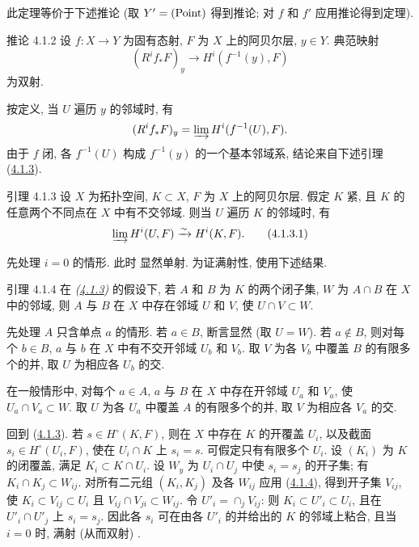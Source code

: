 此定理等价于下述推论 (取 $Y'= (\operatorname{Point})$ 得到推论; 对 $f$ 和 $f'$ 应用推论得到定理).

\begin{enonce*}{推论 4.1.2}
设 $f : X \to Y$ 为固有态射, $F$ 为 $X$ 上的阿贝尔层, $y \in Y$.
典范映射
$$
(R^i f_{\ast} F)_y \longrightarrow H^i(f^{-1} (y), F)
$$
为双射.
\end{enonce*}

按定义, 当 $U$ 遍历 $y$ 的邻域时, 有
$$
(R^if_{\ast} F)_y = \varinjlim H^i(f^{-1} (U), F){}.
$$
由于 $f$ 闭, 各 $f^{-1}(U)$ 构成 $f^{-1}(y)$ 的一个基本邻域系,
结论来自下述引理 (\hyperref[Vbis.lem4.1.3]{4.1.3}).

\begin{enonce*}{引理 4.1.3}
设\pageoriginale{} $X$ 为拓扑空间, $K \subset X$, $F$ 为 $X$ 上的阿贝尔层.
假定 $K$ 紧, 且 $K$ 的任意两个不同点在 $X$ 中有不交邻域.
则当 $U$ 遍历 $K$ 的邻域时, 有
\begin{equation*}
\varinjlim H^i(U, F) \xrightarrow{\sim} H^i(K, F){}.\tag{4.1.3.1}
\end{equation*}
\end{enonce*}

先处理 $i = 0$ 的情形.
此时  显然单射.
为证满射性, 使用下述结果.

\begin{enonce*}{引理 4.1.4}
在 \emph{(\hyperref[Vbis.lem4.1.3]{4.1.3})} 的假设下,
若 $A$ 和 $B$ 为 $K$ 的两个闭子集, $W$ 为 $A \cap B$ 在 $X$ 中的邻域,
则 $A$ 与 $B$ 在 $X$ 中存在邻域 $U$ 和 $V$, 使 $U \cap V \subset W$.
\end{enonce*}

先处理 $A$ 只含单点 $a$ 的情形. 若 $a \in B$, 断言显然 (取 $U = W$).
若 $a \not \in B$, 则对每个 $b \in B$, $a$ 与 $b$ 在 $X$ 中有不交开邻域 $U_b$ 和 $V_b$.
取 $V$ 为各 $V_b$ 中覆盖 $B$ 的有限多个的并,
取 $U$ 为相应各 $U_b$ 的交.

在一般情形中, 对每个 $a \in A$, $a$ 与 $B$ 在 $X$ 中存在开邻域 $U_a$ 和 $V_a$,
使 $U_a \cap V_a \subset W$.
取 $U$ 为各 $U_a$ 中覆盖 $A$ 的有限多个的并,
取 $V$ 为相应各 $V_a$ 的交.

回到 (\hyperref[Vbis.lem4.1.3]{4.1.3}).
若 $s \in H^{\circ}(K, F)$, 则在 $X$ 中存在 $K$ 的开覆盖 $U_i$,
以及截面 $s_i \in H^{\circ}(U_i, F)$, 使在 $U_i \cap K$ 上 $s_i = s$.
可假定只有有限多个 $U_i$.
设 $(K_i)$ 为 $K$ 的闭覆盖, 满足 $K_i \subset K \cap U_i$.
设 $W_y$ 为 $U_i \cap U_j$ 中使 $s_i = s_j$ 的开子集;
有 $K_i \cap K_j \subset W_{ij}$.
对所有二元组 $(K_i, K_j)$ 及各 $W_{ij}$ 应用 (\hyperref[Vbis.lem4.1.4]{4.1.4}),
得到开子集 $V_{ij}$, 使 $K_i \subset V_{ij} \subset U_i$
且 $V_{ij} \cap V_{ji} \subset W_{ij}$.
令 $U'_i = \displaystyle\mathop{\cap}_j V_{ij}$:
则 $K_i \subset U'_i \subset U_i$, 且在 $U'_i \cap U'_j$ 上 $s_i = s_j$.
因此各 $s_i$ 可在由各 $U'_i$ 的并给出的 $K$ 的邻域上粘合,\pageoriginale
且当 $i = 0$ 时,  满射 (从而双射)
.

